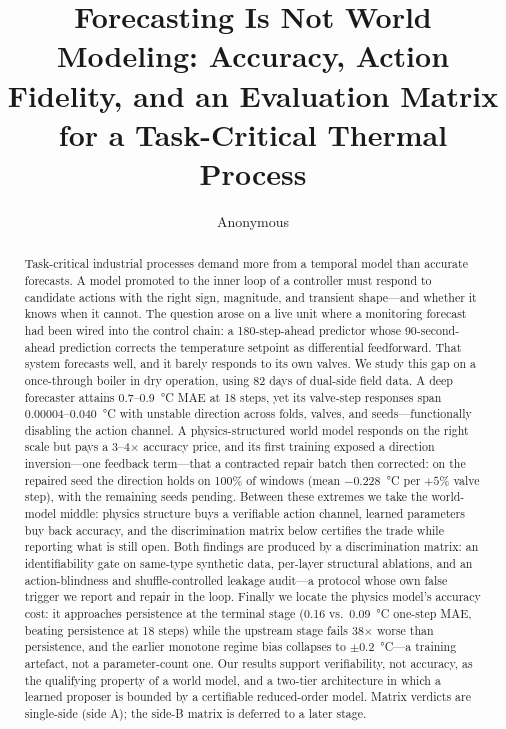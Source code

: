 \documentclass{article}
\title{Forecasting Is Not World Modeling: Accuracy, Action Fidelity, and an Evaluation Matrix for a Task-Critical Thermal Process}
\author{Anonymous}
\begin{document}
\maketitle

\begin{abstract}
Task-critical industrial processes demand more from a temporal model than accurate
forecasts. A model promoted to the inner loop of a controller must respond to candidate
actions with the right sign, magnitude, and transient shape---and whether it knows
when it cannot. The question arose on a live unit where a monitoring forecast had been wired
into the control chain: a 180-step-ahead predictor whose 90-second-ahead prediction
corrects the temperature setpoint as differential feedforward. That system forecasts
well, and it barely responds to its own valves. We study this gap on a once-through
boiler in dry operation, using 82 days of dual-side field data. A deep forecaster
attains 0.7--0.9~\si{\degreeCelsius} MAE at 18 steps, yet its valve-step responses span
0.00004--0.040~\si{\degreeCelsius} with unstable direction across folds, valves, and
seeds---functionally disabling the action channel. A physics-structured world model
responds on the right scale but pays a 3--4$\times$ accuracy price, and its first
training exposed a direction inversion---one feedback term---that a contracted
repair batch then corrected: on the repaired seed the direction holds on 100\% of
windows (mean $-0.228$~\si{\degreeCelsius} per $+5\%$ valve step), with the
remaining seeds pending. Between these extremes we take the world-model middle:
physics structure buys a verifiable action channel, learned parameters buy back
accuracy, and the discrimination matrix below certifies the trade while reporting
what is still open. Both findings are produced by a discrimination matrix: an
identifiability gate on same-type synthetic data, per-layer structural ablations, and
an action-blindness and shuffle-controlled leakage audit---a protocol whose own false
trigger we report and repair in the loop. Finally we locate the physics model's
accuracy cost: it approaches persistence at the terminal stage (0.16 vs.\
0.09~\si{\degreeCelsius} one-step MAE, beating persistence at 18 steps) while the
upstream stage fails 38$\times$ worse than persistence, and the earlier monotone
regime bias collapses to $\pm$0.2~\si{\degreeCelsius}---a training artefact, not a
parameter-count one. Our results support verifiability, not accuracy, as the
qualifying property of a world model, and a two-tier architecture in which a learned
proposer is bounded by a certifiable reduced-order model. Matrix verdicts are
single-side (side A); the side-B matrix is deferred to a later stage.
\end{abstract}
\end{document}
